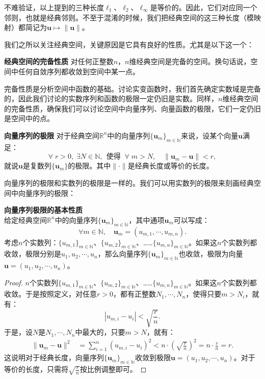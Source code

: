 \documentclass[12pt,UTF8,fontset=none]{ctexbook}
\begin{document}
不难验证，以上提到的三种长度$\ell_1$、$\ell_2$、$\ell_{\infty}$是等价的。因此，它们对应同一个邻则，也就是经典邻则。不至于混淆的时候，我们把经典空间的这三种长度（模映射）都简记为$\mathbf{u}\mapsto \|\mathbf{u}\|$。

我们之所以关注经典空间，关键原因是它具有良好的性质。尤其是以下这一个：
\begin{tm}{\textbf{经典空间的完备性质}}\label{tm:0-4-20}
    对任何正整数$n$，$n$维经典空间是完备的空间。换句话说，空间中任何自敛序列都收敛到空间中某一点。
\end{tm}
完备性质是分析空间中函数的基础。讨论实变函数时，我们首先确定实数域是完备的，因此我们讨论的实数序列和函数的极限一定仍旧是实数。同样，$n$维经典空间的完备性质，确保我们可以讨论空间中向量序列、向量函数的极限，它们一定仍旧是空间中的点。

\begin{df}{\textbf{向量序列的极限}}
    对于经典空间$\mathbb{R}^n$中的向量序列$\{\mathbf{u}_m\}_{m\in\mathbb{N}}$来说，设某个向量$\mathbf{u}$满足：
    $$ \forall \;r > 0 ,\; \exists N\in \mathbb{N},\;\, \mbox{使得}\;\; \forall \; m>N, \quad \| \mathbf{u}_m - \mathbf{u} \| < r, $$
    就说$\mathbf{u}$是复数列$\{\mathbf{u}_m\}$的极限。其中$\|\cdot \|$是经典长度或等价的长度。
\end{df}

向量序列的极限和实数列的极限是一样的。我们可以用实数列的极限来刻画经典空间中向量序列的极限：
\begin{tm}\label{tm:0-4-30}
    \textbf{向量序列极限的基本性质}\\
    给定经典空间$\mathbb{R}^n$中的向量序列$\{\mathbf{u}_m\}_{m\in\mathbb{N}}$，其中通项$\mathbf{u}_m$可以写成：
    $$ \forall m\in\mathbb{N}, \quad \mathbf{u}_m = (u_{m,1}, \cdots, u_{m,n}).$$
    考虑$n$个实数列：$\{u_{m,1}\}_{m\in\mathbb{N}}$、$\{u_{m,2}\}_{m\in\mathbb{N}}$、……$\{u_{m,n}\}_{m\in\mathbb{N}}$。如果这$n$个实数列都收敛，极限分别是$u_1, u_2, \cdots, u_n$，那么向量序列$\{\mathbf{u}_m\}_{m\in\mathbb{N}}$也收敛，极限为向量$\mathbf{u} = (u_1, u_2, \cdots, u_n)$。
\end{tm}

\begin{proof}
    $n$个实数列$\{u_{m,1}\}_{m\in\mathbb{N}}$、$\{u_{m,2}\}_{m\in\mathbb{N}}$、……$\{u_{m,n}\}_{m\in\mathbb{N}}$。如果这$n$个实数列都收敛。于是按照定义，对任意$r>0$，都有正整数$N_1, \cdots, N_n$，使得只要$m>N_i$，就有：
    $$ |u_{m,i} - u_i| < \sqrt{\frac{r}{n}}.$$
    于是，设$N$是$N_1, \cdots, N_n$中最大的，只要$m>N$，就有：
    \begin{align*}
        \| \mathbf{u}_m - \mathbf{u} \|^2 &= \sum_{i=1}^n (u_{m,i} - u_i)^2 < n \cdot \left(\sqrt{\frac{r}{n}}\right)^2 = n \cdot \frac{r}{n} = r.
    \end{align*}
    这说明对于经典长度，向量序列$\{\mathbf{u}_m\}_{m\in\mathbb{N}}$收敛到极限$\mathbf{u} = (u_1, u_2, \cdots, u_n)$。对于等价的长度，只需将$\sqrt{\frac{r}{n}}$按比例调整即可。

\end{proof}
\end{document}
